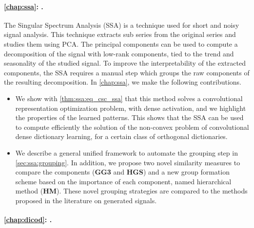 \documentclass[../thesis.tex]{subfiles}
\begin{document}



\paragraph{\autoref{chap:ssa}: .}
\label{par:contrib:ssa}

The Singular Spectrum Analysis (SSA) is a technique used for short and noisy signal analysis. This technique extracts sub series from the original series and studies them using PCA. The principal components can be used to compute a decomposition of the signal with low-rank components, tied to the trend and seasonality of the studied signal. To improve the interpretability of the extracted components, the SSA requires a manual step which groups the raw components of the resulting decomposition. In \autoref{chap:ssa}, we make the following contributions.

\begin{itemize}\itemsep.2em
	\renewcommand{\labelitemi}{\raisebox{-.1em}{\color{linkcolor!50}$\blacktriangleright$}}

	\item We show with \autoref{thm:ssa:eq_csc_ssa} that this method solves a convolutional
	representation optimization problem, with dense activation, and we highlight the properties
	of the learned patterns. This shows that the SSA can be used to compute efficiently the
	solution of the non-convex problem of convolutional dense dictionary learning, for
	a certain class of orthogonal dictionaries.

	\item We describe a general unified framework to automate the grouping step
	in \autoref{sec:ssa:grouping}. In addition, we propose two novel similarity
	measures to compare the components (\textbf{GG3} and \textbf{HGS}) and a new
	group formation scheme based on the importance of each component, named
	hierarchical method (\textbf{HM}). These novel grouping strategies are
	compared to the methods proposed in the literature on generated signals.

\end{itemize}




\paragraph{\autoref{chap:dicod}: .}
\label{par:contrib:dicod}
\end{document}
